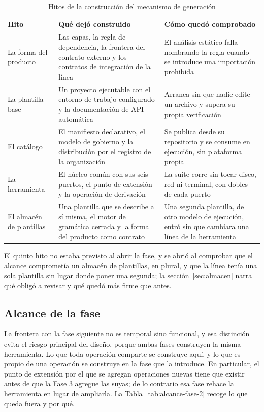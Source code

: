 \begin{table}[H]
\centering
{\footnotesize
\begin{tabular}{p{2.9cm}p{6.1cm}p{5.4cm}}
\toprule
\textbf{Hito} & \textbf{Qué dejó construido} & \textbf{Cómo quedó comprobado} \\
\midrule
La forma del producto & Las capas, la regla de dependencia, la frontera del contrato externo y los contratos de integración de la línea & El análisis estático falla nombrando la regla cuando se introduce una importación prohibida \\
La plantilla base & Un proyecto ejecutable con el entorno de trabajo configurado y la documentación de API automática & Arranca sin que nadie edite un archivo y supera su propia verificación \\
El catálogo & El manifiesto declarativo, el modelo de gobierno y la distribución por el registro de la organización & Se publica desde su repositorio y se consume en ejecución, sin plataforma propia \\
La herramienta & El núcleo común con sus seis puertos, el punto de extensión y la operación de derivación & La suite corre sin tocar disco, red ni terminal, con dobles de cada puerto \\
El almacén de plantillas & Una plantilla que se describe a sí misma, el motor de gramática cerrada y la forma del producto como contrato & Una segunda plantilla, de otro modelo de ejecución, entró sin que cambiara una línea de la herramienta \\
\bottomrule
\end{tabular}
}
\caption{Hitos de la construcción del mecanismo de generación}
\label{tab:hitos-generacion}
\end{table}

El quinto hito no estaba previsto al abrir la fase, y se abrió al comprobar que
el alcance comprometía un almacén de plantillas, en plural, y que la línea
tenía una sola plantilla sin lugar donde poner una segunda; la
sección~\ref{sec:almacen} narra qué obligó a revisar y qué quedó más firme
que antes.

\subsection{Alcance de la fase}
\label{sec:alcance-fase-2}

La frontera con la fase siguiente no es temporal sino funcional, y esa
distinción evita el riesgo principal del diseño, porque ambas fases construyen
la misma herramienta. Lo que toda operación comparte se construye aquí, y lo que
es propio de una operación se construye en la fase que la introduce. En
particular, el punto de extensión por el que se agregan operaciones nuevas
tiene que existir antes de que la Fase 3 agregue las suyas; de lo contrario
esa fase rehace la herramienta en lugar de ampliarla. La
Tabla~\ref{tab:alcance-fase-2} recoge lo que queda fuera y por qué.

